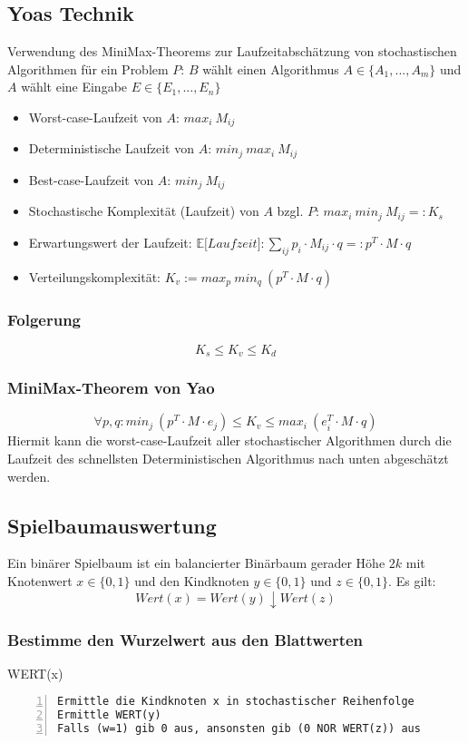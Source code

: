 \subsection{Yoas Technik}
Verwendung des MiniMax-Theorems zur Laufzeitabschätzung von stochastischen Algorithmen für ein Problem \(P\):
\(B\) wählt einen Algorithmus \(A \in \{A_1,...,A_m\}\) und \(A\) wählt eine Eingabe \(E \in \{E_1,...,E_n\}\)
\begin{itemize}
	\item Worst-case-Laufzeit von \(A\): \(max_i~M_{ij}\)
	\item Deterministische Laufzeit von \(A\): \(min_j~max_i~M_{ij}\)
	\item Best-case-Laufzeit von \(A\): \(min_j~M_{ij}\)
	\item Stochastische Komplexität (Laufzeit) von \(A\) bzgl. \(P\): \(max_i~min_j~M_{ij} =: K_s\)
	\item Erwartungswert der Laufzeit: \(\mathbb{E}\lbrack Laufzeit \rbrack: \sum_{ij} p_i \cdot M_{ij} \cdot q =: p^T \cdot M \cdot q\)
	\item Verteilungskomplexität: \(K_v := max_p~min_q~(p^T \cdot M \cdot q)\)
\end{itemize}

\subsubsection{Folgerung}
\[K_s \leq K_v \leq K_d\]

\subsubsection{MiniMax-Theorem von Yao}
\[\forall p,q: min_j~(p^T \cdot M \cdot e_j) \leq K_v \leq max_i~(e_i^T \cdot M \cdot q)\]
Hiermit kann die worst-case-Laufzeit aller stochastischer Algorithmen durch die Laufzeit des schnellsten Deterministischen Algorithmus nach unten abgeschätzt werden.


\subsection{Spielbaumauswertung}
Ein binärer Spielbaum ist ein balancierter Binärbaum gerader Höhe \(2k\) mit Knotenwert \(x \in \{0,1\}\) und den Kindknoten \(y \in \{0,1\}\) und \(z \in \{0,1\}\). Es gilt:
\[Wert(x) = Wert(y) \downarrow Wert(z)\]

\subsubsection{Bestimme den Wurzelwert aus den Blattwerten}
WERT(x)
\begin{lstlisting}[frame=single,numbers=left]
Ermittle die Kindknoten x in stochastischer Reihenfolge
Ermittle WERT(y)
Falls (w=1) gib 0 aus, ansonsten gib (0 NOR WERT(z)) aus
\end{lstlisting}



